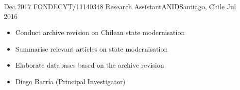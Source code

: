 \begin{experiences}
  \emptySeparator 
  \experience 
    {Dec 2017} {FONDECYT/11140348 Research Assistant}{ANID}{Santiago, Chile} {Jul 2016}
    {\begin{itemize}
    \item Conduct archive revision on Chilean state modernisation
    \item Summarise relevant articles on state modernisation
    \item Elaborate databases based on the archive revision
    \item Diego Barría {\small (Principal Investigator)}
    \end{itemize}}
    {}
\end{experiences}
\vspace{-2mm}

